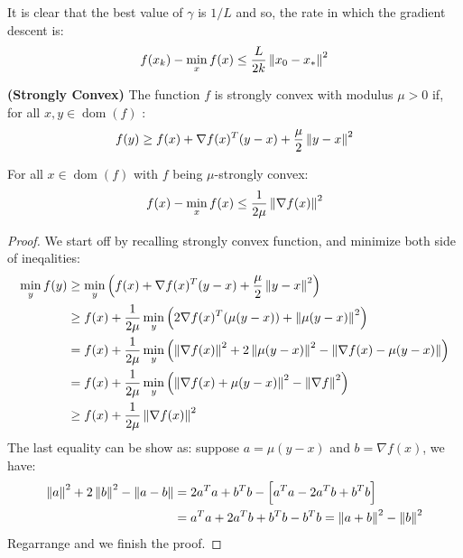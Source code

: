 \begin{corollary}
    It is clear that the best value of $\gamma$ is $1/L$ and so, the rate in which the gradient descent is:
    \begin{equation*}
        f(x_k) - \min_{x} f(x) \le \frac{L}{2k}\left\lVert x_0- x_*\right\rVert^2
    \end{equation*}
\end{corollary}

\begin{definition}{\textbf{(Strongly Convex)}}
    The function $f$ is strongly convex with modulus $\mu>0$ if, for all $x, y\in\operatorname{dom}(f)$ :
    \begin{equation*}
        f(y) \ge f(x) + \nabla f(x)^T(y-x) + \frac{\mu}{2}\left\lVert y-x\right\rVert^2
    \end{equation*}
\end{definition}

\begin{proposition}
    For all $x\in\operatorname{dom}(f)$ with $f$ being $\mu$-strongly convex:
    \begin{equation*}
        f(x) - \min_{x} f(x) \le \frac{1}{2\mu}\left\lVert\nabla f(x)\right\rVert^2
    \end{equation*}
\end{proposition}
\begin{proof}
    We start off by recalling strongly convex function, and minimize both side of ineqalities:
    \begin{equation*}
    \begin{aligned}
        \min_{y} f(y) &\ge \min_{y}\left( f(x) + \nabla f(x)^T(y-x) + \frac{\mu}{2}\left\lVert y-x\right\rVert^2 \right) \\
        &\ge f(x) + \frac{1}{2\mu}\min_y\left( 2\nabla f(x)^T(\mu(y-x)) + \left\lVert\mu(y-x)\right\rVert^2 \right) \\
        &= f(x) + \frac{1}{2\mu}\min_y\left( \left\lVert\nabla f(x)\right\rVert^2 + 2\left\lVert\mu(y-x)\right\rVert^2 - \left\lVert\nabla f(x) - \mu(y-x)\right\rVert  \right) \\
        &= f(x) + \frac{1}{2\mu}\min_y\left( \left\lVert\nabla f(x) + \mu(y-x)\right\rVert^2 - \left\lVert\nabla f\right\rVert^2  \right) \\
        &\ge f(x) + \frac{1}{2\mu}\left\lVert\nabla f(x)\right\rVert^2\\
    \end{aligned}
    \end{equation*}
    The last equality can be show as: suppose $a = \mu(y-x)$ and $b =\nabla f(x)$, we have:
    \begin{equation*}
    \begin{aligned}
        \left\lVert a\right\rVert^2 + 2\left\lVert b\right\rVert^2 - \left\lVert a-b\right\rVert &= 2a^Ta + b^Tb -\Big[ a^Ta - 2a^Tb + b^Tb \Big] \\
        &= a^Ta + 2a^Tb + b^Tb - b^Tb = \left\lVert a+b\right\rVert^2 - \left\lVert b\right\rVert^2
    \end{aligned}
    \end{equation*}
    Regarrange and we finish the proof.
\end{proof}

